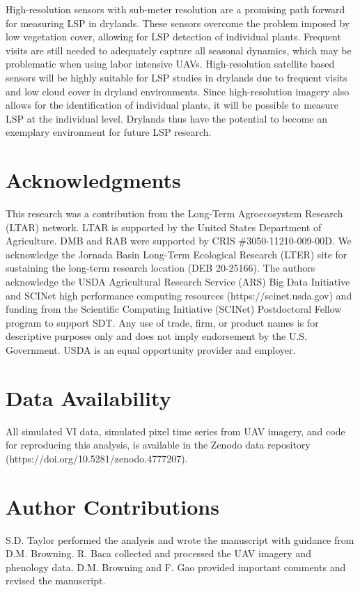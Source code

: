 \documentclass{article}
\begin{document}
High-resolution sensors with sub-meter resolution are a promising path forward for measuring LSP in drylands. These sensors overcome the problem imposed by low vegetation cover, allowing for LSP detection of individual plants. Frequent visits are still needed to adequately capture all seasonal dynamics, which may be problematic when using labor intensive UAVs. High-resolution satellite based sensors will be highly suitable for LSP studies in drylands due to frequent visits and low cloud cover in dryland environments. Since high-resolution imagery also allows for the identification of individual plants, it will be possible to measure LSP at the individual level. Drylands thus have the potential to become an exemplary environment for future LSP research. 

\section*{Acknowledgments}
This research was a contribution from the Long-Term Agroecosystem Research (LTAR) network. LTAR is supported by the United States Department of Agriculture. DMB and RAB were supported by CRIS \#3050-11210-009-00D. We acknowledge the Jornada Basin Long-Term Ecological Research (LTER) site for sustaining the long-term research location (DEB 20-25166). The authors acknowledge the USDA Agricultural Research Service (ARS) Big Data Initiative and SCINet high performance computing resources (https://scinet.usda.gov) and funding from the Scientific Computing Initiative (SCINet) Postdoctoral Fellow program to support SDT. Any use of trade, firm, or product names is for descriptive purposes only and does not imply endorsement by the U.S. Government. USDA is an equal opportunity provider and employer.

\section*{Data Availability}
All simulated VI data, simulated pixel time series from UAV imagery, and code for reproducing this analysis, is available in the Zenodo data repository (https://doi.org/10.5281/zenodo.4777207).

\section*{Author Contributions} 
S.D. Taylor performed the analysis and wrote the manuscript with guidance from D.M. Browning. R. Baca collected and processed the UAV imagery and phenology data. D.M. Browning and F. Gao provided important comments and revised the manuscript.
\end{document}
